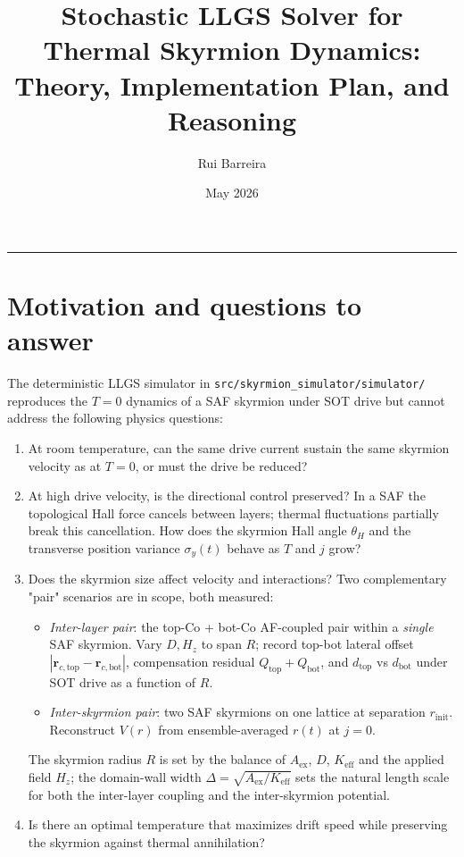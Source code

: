 \documentclass[11pt,a4paper]{article}
\title{Stochastic LLGS Solver for Thermal Skyrmion Dynamics:\\
Theory, Implementation Plan, and Reasoning}
\author{Rui Barreira}
\date{May 2026}
\newcommand{\mb}[1]{\mathbf{#1}}
\newcommand{\Aex}{A_{\text{ex}}}
\newcommand{\Keff}{K_{\text{eff}}}
\newcommand{\jcur}{j}
\begin{document}
\maketitle

\tableofcontents
\bigskip\hrule\bigskip

\section{Motivation and questions to answer}

The deterministic LLGS simulator in \texttt{src/skyrmion\_simulator/simulator/} reproduces
the $T = 0$ dynamics of a SAF skyrmion under SOT drive but cannot
address the following physics questions:

\begin{enumerate}[leftmargin=2em]
    \item[\textbf{Q1}] At room temperature, can the same drive current
    sustain the same skyrmion velocity as at $T = 0$, or must the
    drive be reduced?
    \item[\textbf{Q2}] At high drive velocity, is the directional
    control preserved? In a SAF the topological Hall force cancels
    between layers; thermal fluctuations partially break this
    cancellation. How does the skyrmion Hall angle $\theta_H$ and the
    transverse position variance $\sigma_y(t)$ behave as $T$ and
    $\jcur$ grow?
    \item[\textbf{Q3}] Does the skyrmion size affect velocity and
    interactions? Two complementary "pair" scenarios are in scope,
    both measured:
    \begin{itemize}[leftmargin=1.5em, nosep]
        \item[(Q3a)] \emph{Inter-layer pair}: the top-Co + bot-Co
        AF-coupled pair within a \emph{single} SAF skyrmion. Vary
        $D, H_z$ to span $R$; record top-bot lateral offset
        $|\mb{r}_{c,\text{top}} - \mb{r}_{c,\text{bot}}|$,
        compensation residual $Q_{\text{top}} + Q_{\text{bot}}$, and
        $d_{\text{top}}$ vs $d_{\text{bot}}$ under SOT drive as a
        function of $R$.
        \item[(Q3b)] \emph{Inter-skyrmion pair}: two SAF skyrmions on
        one lattice at separation $r_{\text{init}}$. Reconstruct
        $V(r)$ from ensemble-averaged $r(t)$ at $\jcur = 0$.
    \end{itemize}
    The skyrmion radius $R$ is set by the balance of $\Aex$, $D$,
    $\Keff$ and the applied field $H_z$; the domain-wall width
    $\Delta = \sqrt{\Aex/\Keff}$ sets the natural length scale for
    both the inter-layer coupling and the inter-skyrmion potential.
    \item[\textbf{Q4}] Is there an optimal temperature that maximizes
    drift speed while preserving the skyrmion against thermal
    annihilation?
\end{enumerate}
\end{document}

